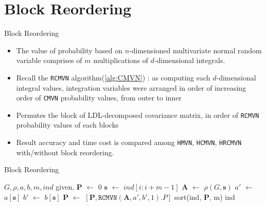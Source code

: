 \section{Block Reordering}

\begin{frame}{Block Reordering}
\begin{itemize}
	\item The value of probability based on $n$-dimensioned multivariate normal random variable comprises of $m$ multiplications of $d$-dimensional integrals.
	\item Recall the \texttt{RCMVN} algorithm(\ref{alg:CMVN}) : as computing each $d$-dimensional integral values, integration variables were arranged in order of increasing order of \texttt{CMVN} probability values, from outer to inner
	\item Permutes the block of LDL-decomposed covariance matrix, in order of \texttt{RCMVN} probability values of each blocks
	\item Result accuracy and time cost is compared among \texttt{HMVN}, \texttt{HCMVN}, \texttt{HRCMVN} with/without block reordering.
\end{itemize}
\end{frame}

\begin{frame}{Block Reordering}
\begin{algorithm}[H]
\caption{Blockwise reordering}
\begin{algorithmic}
	\scriptsize
	\State $G, \rho, a, b, m, ind$ given, $\mathbf{P}$ $\leftarrow$ $0$
	\State $\mathbf{s}$ $\leftarrow$ $ind[i:i+m-1]$
	\State $\mathbf{A}$ $\leftarrow$ $\rho(G, \mathbf{s})$
	\State $a'$ $\leftarrow$ $a[\mathbf{s}]$
	\State $b'$ $\leftarrow$ $b[\mathbf{s}]$
	\State $\mathbf{P}$ $\leftarrow$ $[\mathbf{P}, \texttt{RCMVN}(\mathbf{A},a',b',1).P]$
	\EndFor
	\State sort(ind, $\mathbf{P}$, m)
	\State \Return ind
	\EndProcedure
\end{algorithmic}\label{alg:BR}	
\end{algorithm}
\end{frame}


